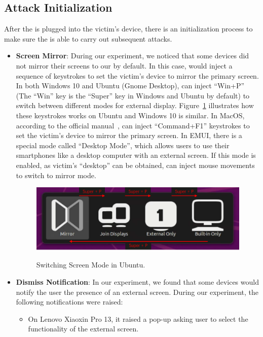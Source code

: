 \subsection{Attack Initialization}
\label{subsec:attack_init}
After the \tool is plugged into the victim's device, there is an initialization process to make sure the \tool is able to carry out subsequent attacks.
\begin{itemize}
	\item \textbf{Screen Mirror}:
		During our experiment, we noticed that some devices did not mirror their screens to our \tool by default. In this case, \tool would inject a sequence of keystrokes to set the victim's device to mirror the primary screen. In both Windows 10 and Ubuntu (Gnome Desktop), \tool can inject ``Win+P'' (The ``Win'' key is the ``Super'' key in Windows and Ubuntu by default) to switch between different modes for external display. Figure~\ref{fig:ubuntu_switch} illustrates how these keystrokes works on Ubuntu and Windows 10 is similar. In MacOS, according to the official manual~\cite{appleman}, \tool can inject \mbox{``Command+F1''} keystrokes to set the victim's device to mirror the primary screen. In EMUI, there is a special mode called ``Desktop Mode'', which allows users to use their smartphones like a desktop computer with an external screen. If this mode is enabled, as victim's ``desktop'' can be obtained, \tool can inject mouse movements to switch to mirror mode.
		\begin{figure}[H]
			\includegraphics[width=\linewidth]{./Figs/ubuntu_switch.png}\\
			\caption{Switching Screen Mode in Ubuntu.}
			\label{fig:ubuntu_switch}
		\end{figure}
	\item \textbf{Dismiss Notification}:
		In our experiment, we found that some devices would notify the user the presence of an external screen. During our experiment, the following notifications were raised:
		\begin{itemize}
		 \item On Lenovo Xiaoxin Pro 13, it raised a pop-up asking user to select the functionality of the external screen.

\end{itemize}
\end{itemize}
